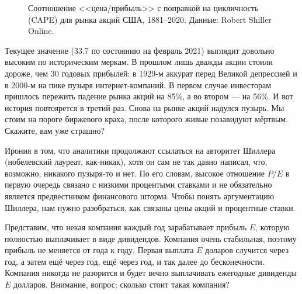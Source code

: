 \begin{figure}[ht]
\centering
{}
\caption{Соотношение <<цена/прибыль>> с поправкой на цикличность (CAPE) для рынка акций США, 1881--2020. Данные: Robert Shiller Online.}
\label{shiller_pe_historical_chart}
\end{figure}

Текущее значение (33.7 по состоянию на февраль 2021) выглядит довольно высоким по историческим меркам. В прошлом лишь дважды акции стоили дороже, чем 30 годовых прибылей: в 1929-м аккурат перед Великой депрессией и в 2000-м на пике пузыря интернет-компаний. В первом случае инвесторам пришлось пережить падение рынка акций на 85\%, а во втором --- на 56\%. И вот история повтоярется в третий раз. Снова на рынке акций надулся пузырь. Мы стоим на пороге биржевого краха, после которого живые позавидуют мёртвым. Скажите, вам уже страшно?

Ирония в том, что аналитики продолжают ссылаться на авторитет Шиллера (нобелевский лауреат, как-никак), хотя он сам не так давно написал, что, возможно, никакого пузыря-то и нет. По его словам, высокое отношение $P/E$ в первую очередь связано с низкими процентыми ставками и не обязательно является предвестником финансового шторма. Чтобы понять аргументацию Шиллера, нам нужно разобраться, как связаны цены акций и процентные ставки.

Представим, что некая компания каждый год зарабатывает прибыль $E$, которую полностью выплачивает в виде дивидендов. Компания очень стабильная, поэтому прибыль не меняется от года к году. Первая выплата $E$ доларов случится через год, а затем ещё через год, ещё через год, и так далее до бесконечности. Компания никогда не разорится и будет вечно выплачивать ежегодные дивиденды $E$ долларов. Внимание, вопрос: сколько стоит такая компания?

